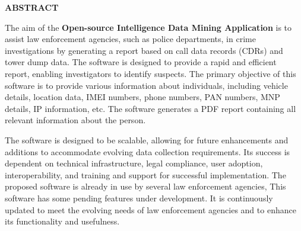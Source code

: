 \thispagestyle{plain}
\begin{center}
    \Large \textbf{\uppercase{Abstract}}
\end{center}

\vspace{3\baselineskip}

\vspace{1ex}
\justify

The aim of the \textbf{Open-source Intelligence Data Mining Application}  is to assist law enforcement agencies, such as police departments, in crime investigations by generating a report based on call data records (CDRs) and tower dump data. The software is designed to provide a rapid and efficient report, enabling investigators to identify suspects.
The primary objective of this software is to provide various information about individuals, including vehicle details, location data, IMEI numbers, phone numbers, PAN numbers, MNP details, IP information, etc. The software generates a PDF report containing all relevant information about the person.

The software is designed to be scalable, allowing for future enhancements and additions to accommodate evolving data collection requirements. Its success is dependent on technical infrastructure, legal compliance, user adoption, interoperability, and training and support for successful implementation.
The proposed software is already in use by several law enforcement agencies, This software has some pending features under development. It is continuously updated to meet the evolving needs of law enforcement agencies and to enhance its functionality and usefulness.